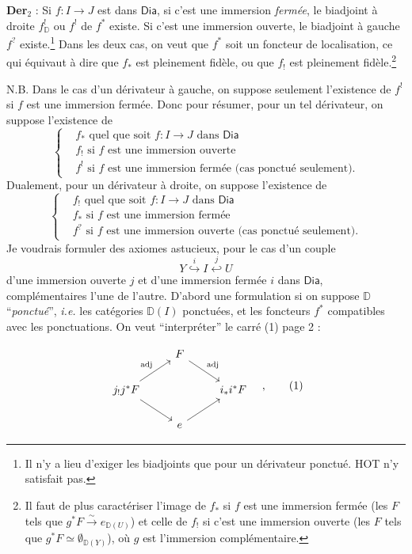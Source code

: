 \documentclass[11pt]{article}
\newcommand{\printedpage}[1]{\marginpar{\footnotesize p.~#1}}
\newcommand{\msp}[1]{\marginpar{\footnotesize [#1]}}
\newcommand{\Dia}{\mathsf{Dia}}
\newcommand{\DD}{\mathbb{D}}
\begin{document}
\msp{page 7}

\textbf{Der}$_2$ : Si $f : I \to J$ est dans $\Dia$, si c'est une immersion \textit{fermée}, le biadjoint à droite $f^!_{\DD}$ ou $f^!$ de $f^*$ existe. Si c'est une immersion ouverte, le biadjoint à gauche $f^?$ existe.\footnote{Il n'y a lieu d'exiger les biadjoints que pour un dérivateur ponctué. \textsf{HOT} n'y satisfait pas.} Dans
\printedpage{6}
les deux cas, on veut que $f^*$ soit un foncteur de localisation, ce qui équivaut à dire que $f_*$ est pleinement fidèle, ou que $f_!$ est pleinement fidèle.\footnote{Il faut de plus caractériser l'image de $f_*$ si $f$ est une immersion fermée (les $F$ tels que $g^*F \overset{\sim}{\to} e_{\DD(U)}$) et celle de $f_!$ si c'est une immersion ouverte (les $F$ tels que $g^*F \simeq \emptyset_{\DD(Y)}$), où $g$ est l'immersion complémentaire.}

N.B. Dans le cas d'un dérivateur à gauche, on suppose seulement l'existence de $f^!$ si $f$ est une immersion fermée. Donc pour résumer, pour un tel dérivateur, on suppose l'existence de
\[
\left\{
\begin{aligned}
& f_* \text{ quel que soit } f : I \to J \text{ dans } \Dia \\
& f_! \text{ si } f \text{ est une immersion ouverte} \\
& f^! \text{ si } f \text{ est une immersion fermée (cas ponctué seulement).}
\end{aligned}
\right.
\]
Dualement, pour un dérivateur à droite, on suppose l'existence de
\[
\left\{
\begin{aligned}
& f_! \text{ quel que soit } f : I \to J \text{ dans } \Dia \\
& f_* \text{ si } f \text{ est une immersion fermée} \\
& f^? \text{ si } f \text{ est une immersion ouverte (cas ponctué seulement).}
\end{aligned}
\right.
\]
Je voudrais formuler des axiomes astucieux, pour le cas d'un couple
\[ Y \overset{i}{\hookrightarrow} I \overset{j}{\hookleftarrow} U \]
d'une immersion ouverte $j$ et d'une immersion fermée $i$ dans $\Dia$, complémentaires l'une de l'autre. D'abord une formulation si on suppose $\DD$ “\textit{ponctué}”, \textit{i.e.} les catégories $\DD(I)$ ponctuées, et les foncteurs $f^*$ compatibles avec les ponctuations. On veut “interpréter” le carré (1) page 2 :

\msp{page 8}

\[
\begin{tikzcd}
& F \arrow[dr, "\mathrm{adj}"] & \\
j_!j^*F \arrow[ur, "\mathrm{adj}"] \arrow[dr] & & i_*i^*F \\
& e \arrow[ur] &
\end{tikzcd}
\quad ,
\tag*{(1)}
\]
\end{document}
